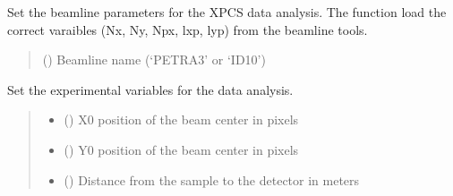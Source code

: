 \documentclass[letterpaper,10pt,english]{sphinxmanual}
\begin{document}

\begin{fulllineitems}
\label{\detokenize{index:XPCS_tools.set_beamline}}
\pysigstartsignatures
\pysiglinewithargsret
{}
{}
{}
\pysigstopsignatures
\sphinxAtStartPar
Set the beamline parameters for the XPCS data analysis. The function load the correct varaibles (Nx, Ny, Npx, lxp, lyp) from the beamline tools.
\begin{quote}\begin{description}
\sphinxAtStartPar
{} () \textendash{} Beamline name (‘PETRA3’ or ‘ID10’)

\end{description}\end{quote}

\end{fulllineitems}


\begin{fulllineitems}
\label{\detokenize{index:XPCS_tools.set_expvar}}
\pysigstartsignatures
\pysiglinewithargsret
{}
{\sphinxparamcomma {}\sphinxparamcomma {}}
{}
\pysigstopsignatures
\sphinxAtStartPar
Set the experimental variables for the data analysis.
\begin{quote}\begin{description}
\begin{itemize}
\item {} 
\sphinxAtStartPar
{} () \textendash{} X0 position of the beam center in pixels

\item {} 
\sphinxAtStartPar
{} () \textendash{} Y0 position of the beam center in pixels

\item {} 
\sphinxAtStartPar
{} () \textendash{} Distance from the sample to the detector in meters

\end{itemize}

\end{description}\end{quote}

\end{fulllineitems}
\end{document}
